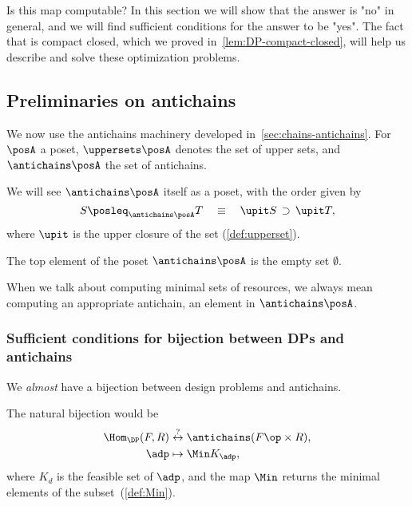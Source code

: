 Is this map computable?
In this section we will show that the answer is "no" in general, and we will find sufficient conditions for the answer to be "yes".
The fact that \DP is compact closed, which we proved in~\cref{lem:DP-compact-closed}, will help us describe and solve these optimization problems.

\subsection{Preliminaries on antichains}

We now use the antichains machinery developed in~\cref{sec:chains-antichains}.
For $\posA$ a poset, $\uppersets \posA$ denotes the set of upper sets, and $\antichains \posA$ the set of antichains.


We will see $\antichains \posA$ itself as a poset, with the order given by
\begin{equation*}
    S \posleq_{\antichains \posA} T  \quad \equiv \quad\upit S\, \supset\,\upit T,
\end{equation*}
where $\upit$ is the upper closure of the set (\cref{def:upperset}).

The top element of the poset $\antichains\posA$ is the empty set $\emptyset$.

When we talk about computing minimal sets of resources, we always mean computing an appropriate antichain, \ie an element in $\antichains \posA$.

\subsubsection{Sufficient conditions for bijection between DPs and antichains}

We \emph{almost} have a bijection between design problems and antichains.

The natural bijection would be
\begin{equation}
    \begin{aligned}
        \Hom_\DP(F,R) & \overset{?
        }{\leftrightarrow} \antichains (F\op \times R), \\
        \adp          & \mapsto \Min K_\adp,
    \end{aligned}
\end{equation}
where $K_d$ is the feasible set of $\adp$,
and the map $\Min$ returns the minimal elements of the subset~(\cref{def:Min}).

